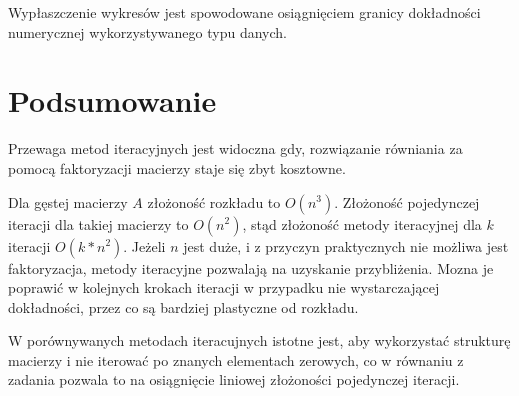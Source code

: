 \documentclass[11pt]{extarticle}
\begin{document}
	Wypłaszczenie wykresów jest spowodowane osiągnięciem granicy dokładności numerycznej wykorzystywanego typu danych.
	
	\pagebreak
	\section{Podsumowanie}
	Przewaga metod iteracyjnych jest widoczna gdy, rozwiązanie równiania za pomocą faktoryzacji macierzy staje się zbyt kosztowne.
	
	Dla gęstej macierzy \(A\) złożoność rozkładu to \(O(n^3)\).
	Złożoność pojedynczej iteracji dla takiej macierzy to \(O(n^2)\), stąd złożoność metody iteracyjnej dla \(k\) iteracji \(O(k*n^2)\).
	Jeżeli \(n\) jest duże, i z przyczyn praktycznych nie możliwa jest faktoryzacja, metody iteracyjne pozwalają na uzyskanie przybliżenia.
	Mozna je poprawić w kolejnych krokach iteracji w przypadku nie wystarczającej dokładności, przez co są bardziej plastyczne od rozkładu.

	W porównywanych metodach iteracujnych istotne jest, aby wykorzystać strukturę macierzy i nie iterować po znanych elementach zerowych, co w równaniu z zadania pozwala to na osiągnięcie liniowej złożoności pojedynczej iteracji.
\end{document}

